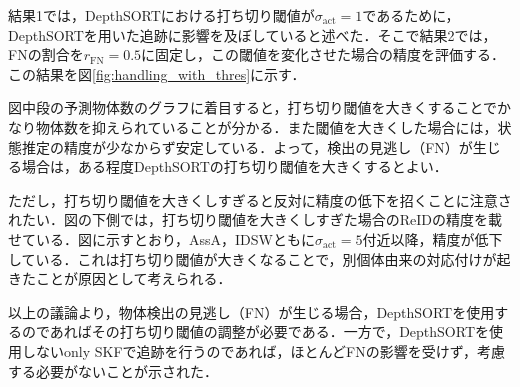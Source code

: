         結果1では，DepthSORTにおける打ち切り閾値が$\sigma_{\text{act}} = 1$であるために，DepthSORTを用いた追跡に影響を及ぼしていると述べた．そこで結果2では，FNの割合を$r_{\text{FN}} = 0.5$に固定し，この閾値を変化させた場合の精度を評価する．この結果を図\ref{fig:handling_with_thres}に示す．

        図中段の予測物体数のグラフに着目すると，打ち切り閾値を大きくすることでかなり物体数を抑えられていることが分かる．また閾値を大きくした場合には，状態推定の精度が少なからず安定している．よって，検出の見逃し（FN）が生じる場合は，ある程度DepthSORTの打ち切り閾値を大きくするとよい．

        ただし，打ち切り閾値を大きくしすぎると反対に精度の低下を招くことに注意されたい．図の下側では，打ち切り閾値を大きくしすぎた場合のReIDの精度を載せている．図に示すとおり，AssA，IDSWともに$\sigma_{\text{act}} = 5$付近以降，精度が低下している．これは打ち切り閾値が大きくなることで，別個体由来の対応付けが起きたことが原因として考えられる．

        以上の議論より，物体検出の見逃し（FN）が生じる場合，DepthSORTを使用するのであればその打ち切り閾値の調整が必要である．一方で，DepthSORTを使用しないonly SKFで追跡を行うのであれば，ほとんどFNの影響を受けず，考慮する必要がないことが示された．

